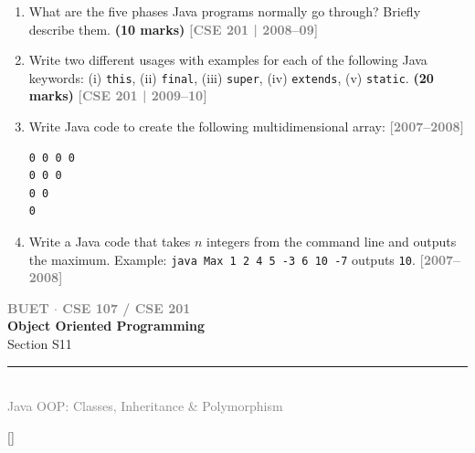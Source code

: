 \documentclass[12pt,a3paper]{article}
\newcommand{\yr}[1]{\hfill\textcolor{gray}{\small\textbf{[#1]}}}
\newcommand{\mk}[1]{\textcolor{orange!70!black}{\small\textbf{(#1 marks)}}}
\newcommand{\secdivider}[4]{%
  \newpage\thispagestyle{empty}%
  \vspace*{\fill}%
  \begin{tcolorbox}[enhanced,colback=#4!7,colframe=#3,boxrule=1.5pt,arc=8pt,
    left=20pt,right=20pt,top=22pt,bottom=22pt,
    shadow={3pt}{-3pt}{0pt}{black!15}]
    \centering
    {\large\textcolor{gray}{\textbf{BUET $\cdot$ CSE 107 / CSE 201}}}\\[8pt]
    {\fontsize{26}{32}\selectfont\bfseries\textcolor{#3}{Object Oriented Programming}}\\[6pt]
    {\fontsize{15}{19}\selectfont\textcolor{dgray}{#1}}\\[12pt]
    \textcolor{#3!60}{\rule{0.5\textwidth}{0.5pt}}\\[6pt]
    {\small\textcolor{gray}{#2}}
  \end{tcolorbox}%
  \vspace*{\fill}\newpage%
}
\begin{document}
\begin{enumerate}



\item What are the five phases Java programs normally go through? Briefly describe them. \mk{10}
\yr{CSE 201 | 2008--09}







\item Write two different usages with examples for each of the following Java keywords: (i) \texttt{this}, (ii) \texttt{final}, (iii) \texttt{super}, (iv) \texttt{extends}, (v) \texttt{static}. \mk{20}
\yr{CSE 201 | 2009--10}




\item Write Java code to create the following multidimensional array:
\yr{2007--2008}
\begin{lstlisting}
0 0 0 0
0 0 0
0 0
0
\end{lstlisting}





\item Write a Java code that takes $n$ integers from the command line and outputs the maximum. Example: \texttt{java Max 1 2 4 5 -3 6 10 -7} outputs \texttt{10}.
\yr{2007--2008}






\end{enumerate}
\newpage

\secdivider{Section S11}{Java OOP: Classes, Inheritance \& Polymorphism}{cC}{cC}
\label{sec:S11}
\titleformat{\section}{\large\bfseries\color{cC}}{}{0em}{}[\titlerule]
\end{document}
